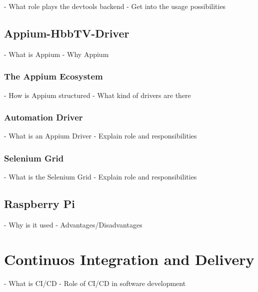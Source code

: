 - What role plays the devtools backend
- Get into the usage possibilities

\subsection{Appium-HbbTV-Driver\label{sec:appiumhbbtvdriver}}

- What is Appium
- Why Appium

\subsubsection{The Appium Ecosystem\label{sec:ecosystem}}

- How is Appium structured
- What kind of drivers are there

\subsubsection{Automation Driver\label{sec:driver}}

- What is an Appium Driver
- Explain role and responsibilities

\subsubsection{Selenium Grid\label{sec:grid}}

- What is the Selenium Grid
- Explain role and responsibilities

\subsection{Raspberry Pi\label{sec:pi}}

- Why is it used
- Advantages/Disadvantages

\section{Continuos Integration and Delivery\label{sec:cicd}}

- What is CI/CD
- Role of CI/CD in software development
